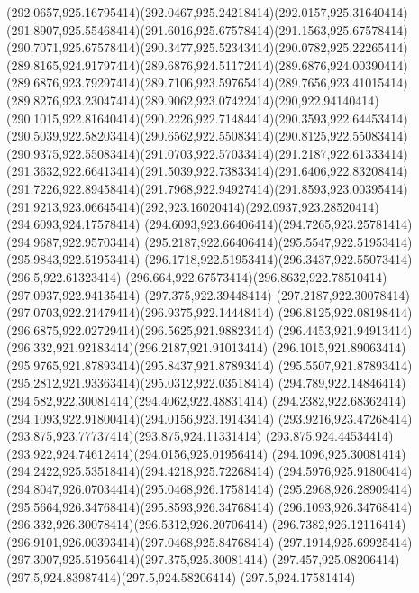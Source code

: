 {{	\curveto(292.0657,925.16795414)(292.0467,925.24218414)(292.0157,925.31640414)
	\curveto(291.8907,925.55468414)(291.6016,925.67578414)(291.1563,925.67578414)
	\curveto(290.7071,925.67578414)(290.3477,925.52343414)(290.0782,925.22265414)
	\curveto(289.8165,924.91797414)(289.6876,924.51172414)(289.6876,924.00390414)
	\curveto(289.6876,923.79297414)(289.7106,923.59765414)(289.7656,923.41015414)
	\curveto(289.8276,923.23047414)(289.9062,923.07422414)(290,922.94140414)
	\curveto(290.1015,922.81640414)(290.2226,922.71484414)(290.3593,922.64453414)
	\curveto(290.5039,922.58203414)(290.6562,922.55083414)(290.8125,922.55083414)
	\curveto(290.9375,922.55083414)(291.0703,922.57033414)(291.2187,922.61333414)
	\curveto(291.3632,922.66413414)(291.5039,922.73833414)(291.6406,922.83208414)
	\curveto(291.7226,922.89458414)(291.7968,922.94927414)(291.8593,923.00395414)
	\curveto(291.9213,923.06645414)(292,923.16020414)(292.0937,923.28520414)
	\closepath
	\moveto(294.6093,924.17578414)
	\curveto(294.6093,923.66406414)(294.7265,923.25781414)(294.9687,922.95703414)
	\curveto(295.2187,922.66406414)(295.5547,922.51953414)(295.9843,922.51953414)
	\curveto(296.1718,922.51953414)(296.3437,922.55073414)(296.5,922.61323414)
	\curveto(296.664,922.67573414)(296.8632,922.78510414)(297.0937,922.94135414)
	\lineto(297.375,922.39448414)
	\curveto(297.2187,922.30078414)(297.0703,922.21479414)(296.9375,922.14448414)
	\curveto(296.8125,922.08198414)(296.6875,922.02729414)(296.5625,921.98823414)
	\curveto(296.4453,921.94913414)(296.332,921.92183414)(296.2187,921.91013414)
	\curveto(296.1015,921.89063414)(295.9765,921.87893414)(295.8437,921.87893414)
	\curveto(295.5507,921.87893414)(295.2812,921.93363414)(295.0312,922.03518414)
	\curveto(294.789,922.14846414)(294.582,922.30081414)(294.4062,922.48831414)
	\curveto(294.2382,922.68362414)(294.1093,922.91800414)(294.0156,923.19143414)
	\curveto(293.9216,923.47268414)(293.875,923.77737414)(293.875,924.11331414)
	\curveto(293.875,924.44534414)(293.922,924.74612414)(294.0156,925.01956414)
	\curveto(294.1096,925.30081414)(294.2422,925.53518414)(294.4218,925.72268414)
	\curveto(294.5976,925.91800414)(294.8047,926.07034414)(295.0468,926.17581414)
	\curveto(295.2968,926.28909414)(295.5664,926.34768414)(295.8593,926.34768414)
	\curveto(296.1093,926.34768414)(296.332,926.30078414)(296.5312,926.20706414)
	\curveto(296.7382,926.12116414)(296.9101,926.00393414)(297.0468,925.84768414)
	\curveto(297.1914,925.69925414)(297.3007,925.51956414)(297.375,925.30081414)
	\curveto(297.457,925.08206414)(297.5,924.83987414)(297.5,924.58206414)
	\lineto(297.5,924.17581414)
}}
